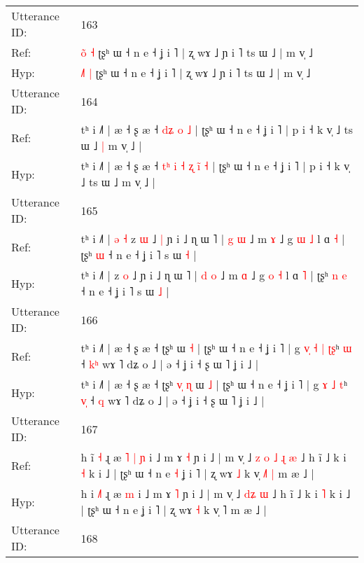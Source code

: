 \documentclass[10pt]{article}
\DeclareRobustCommand{\hl}[1]{{\textcolor{red}{#1}}}
\begin{document}
\begin{longtable}{ll}
 \\
\midrule
Utterance ID: & 163 \\
Ref: & \hl{o}\hl{̃} \hl{˧} ʈʂʰ ɯ ˧ n e ˧ ʝ i ˥ | ʐ wɤ ˩ ɲ i ˥ ts ɯ ˩ | m v̩ ˩
 \\
Hyp: & \hl{˩}\hl{˥} \hl{|} ʈʂʰ ɯ ˧ n e ˧ ʝ i ˥ | ʐ wɤ ˩ ɲ i ˥ ts ɯ ˩ | m v̩ ˩
 \\
\midrule
Utterance ID: & 164 \\
Ref: & tʰ i ˩˥ | æ ˧ ʂ æ ˧\hl{}\hl{}\hl{}\hl{}\hl{} \hl{}\hl{d}\hl{ʑ} \hl{}\hl{o} \hl{˩} | ʈʂʰ ɯ ˧ n e ˧ ʝ i ˥ | p i ˧ k v̩ ˩ ts ɯ ˩\hl{ }\hl{|} m v̩ ˩ |
 \\
Hyp: & tʰ i ˩˥ | æ ˧ ʂ æ ˧\hl{ }\hl{t}\hl{ʰ}\hl{ }\hl{i} \hl{˧}\hl{ }\hl{ʐ} \hl{i}\hl{̃} \hl{˧} | ʈʂʰ ɯ ˧ n e ˧ ʝ i ˥ | p i ˧ k v̩ ˩ ts ɯ ˩\hl{}\hl{} m v̩ ˩ |
 \\
\midrule
Utterance ID: & 165 \\
Ref: & tʰ i ˩˥ |\hl{ }\hl{ə}\hl{ }\hl{˧} z \hl{ɯ} ˩\hl{ }\hl{|} ɲ i ˩ ɳ ɯ ˥ | \hl{g} \hl{ɯ} ˩ m \hl{ɤ} ˩ g \hl{ɯ} \hl{˩} l ɑ \hl{˧} | ʈʂʰ\hl{}\hl{} \hl{ɯ} ˧ n e ˧ ʝ i ˥ s ɯ \hl{˧} |
 \\
Hyp: & tʰ i ˩˥ |\hl{}\hl{}\hl{}\hl{} z \hl{o} ˩\hl{}\hl{} ɲ i ˩ ɳ ɯ ˥ | \hl{d} \hl{o} ˩ m \hl{ɑ} ˩ g \hl{o} \hl{˧} l ɑ \hl{˥} | ʈʂʰ\hl{ }\hl{n} \hl{e} ˧ n e ˧ ʝ i ˥ s ɯ \hl{˩} |
 \\
\midrule
Utterance ID: & 166 \\
Ref: & tʰ i ˩˥ | æ ˧ ʂ æ ˧ ʈʂʰ\hl{}\hl{}\hl{}\hl{}\hl{} ɯ \hl{˧} | ʈʂʰ ɯ ˧ n e ˧ ʝ i ˥ | g\hl{ }\hl{v}\hl{̩} \hl{˧} \hl{|} \hl{ʈ}\hl{ʂ}ʰ \hl{}\hl{ɯ} ˧ \hl{k}\hl{ʰ} wɤ ˥ dʑ o ˩ | ə ˧ ʝ i ˧ ʂ ɯ ˥ ʝ i ˩ |
 \\
Hyp: & tʰ i ˩˥ | æ ˧ ʂ æ ˧ ʈʂʰ\hl{ }\hl{v}\hl{̩}\hl{ }\hl{ɳ} ɯ \hl{˩} | ʈʂʰ ɯ ˧ n e ˧ ʝ i ˥ | g\hl{}\hl{}\hl{} \hl{ɤ} \hl{˩} \hl{}\hl{t}ʰ \hl{v}\hl{̩} ˧ \hl{}\hl{q} wɤ ˥ dʑ o ˩ | ə ˧ ʝ i ˧ ʂ ɯ ˥ ʝ i ˩ |
 \\
\midrule
Utterance ID: & 167 \\
Ref: & h i\hl{̃}\hl{ }\hl{˧} ɻ æ\hl{ }\hl{˥}\hl{ }\hl{|} \hl{ɲ} i ˩ m ɤ \hl{˧} ɲ i ˩ | m v̩ ˩\hl{ }\hl{z}\hl{ }\hl{o} \hl{˩}\hl{ }\hl{ɻ} \hl{æ} ˩ h ĩ ˩ k i \hl{˧} k i ˩ | ʈʂʰ ɯ ˧ n e\hl{ }\hl{˧} ʝ i ˥ | ʐ wɤ \hl{˩} k v̩ \hl{˩}˥\hl{ }\hl{|} m æ ˩ |
 \\
Hyp: & h i\hl{ }\hl{˩}\hl{˥} ɻ æ\hl{}\hl{}\hl{}\hl{} \hl{m} i ˩ m ɤ \hl{˥} ɲ i ˩ | m v̩ ˩\hl{}\hl{}\hl{}\hl{} \hl{}\hl{d}\hl{ʑ} \hl{ɯ} ˩ h ĩ ˩ k i \hl{˥} k i ˩ | ʈʂʰ ɯ ˧ n e\hl{}\hl{} ʝ i ˥ | ʐ wɤ \hl{˧} k v̩ \hl{}˥\hl{}\hl{} m æ ˩ |
 \\
\midrule
Utterance ID: & 168 \\

\end{longtable}
\end{document}
